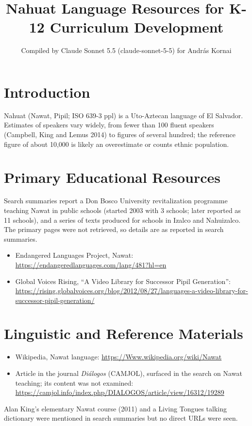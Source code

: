 \documentclass[12pt]{article}
\title{Nahuat Language Resources for K-12 Curriculum Development}
\author{Compiled by Claude Sonnet 5.5 (claude-sonnet-5-5) for Andr\'as Kornai}
\date{}
\begin{document}
\maketitle

\section{Introduction}
Nahuat (Nawat, Pipil; ISO 639-3 ppl) is a Uto-Aztecan language of El Salvador. Estimates of speakers vary widely, from fewer than 100 fluent speakers (Campbell, King and Lemus 2014) to figures of several hundred; the reference figure of about 10,000 is likely an overestimate or counts ethnic population.

\section{Primary Educational Resources}
Search summaries report a Don Bosco University revitalization programme teaching Nawat in public schools (started 2003 with 3 schools; later reported as 11 schools), and a series of texts produced for schools in Izalco and Nahuizalco. The primary pages were not retrieved, so details are as reported in search summaries.
\begin{itemize}
\item Endangered Languages Project, Nawat: \url{https://endangeredlanguages.com/lang/481?hl=en}
\item Global Voices Rising, ``A Video Library for Successor Pipil Generation'': \url{https://rising.globalvoices.org/blog/2012/08/27/languages-a-video-library-for-successor-pipil-generation/}
\end{itemize}

\section{Linguistic and Reference Materials}
\begin{itemize}
\item Wikipedia, Nawat language: \url{https://Www.wikipedia.org/wiki/Nawat}
\item Article in the journal \emph{Di\'alogos} (CAMJOL), surfaced in the search on Nawat teaching; its content was not examined: \url{https://camjol.info/index.php/DIALOGOS/article/view/16312/19289}
\end{itemize}
Alan King's elementary Nawat course (2011) and a Living Tongues talking dictionary were mentioned in search summaries but no direct URLs were seen.
\end{document}
